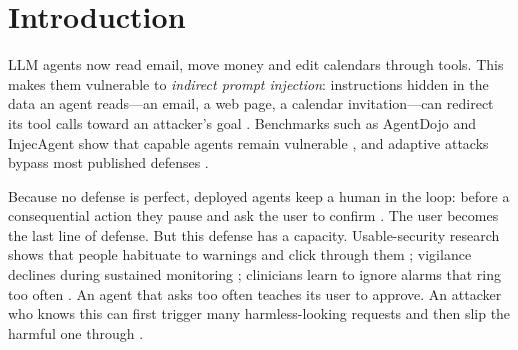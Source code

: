 \documentclass[10pt]{article}
\theoremstyle{plain}
\theoremstyle{definition}
\begin{document}
\section{Introduction}\label{sec:intro}

LLM agents now read email, move money and edit calendars through tools. This makes them vulnerable to \emph{indirect prompt injection}: instructions hidden in the data an agent reads---an email, a web page, a calendar invitation---can redirect its tool calls toward an attacker's goal \citep{greshake2023not}. Benchmarks such as AgentDojo and InjecAgent show that capable agents remain vulnerable \citep{debenedetti2024agentdojo,zhan2024injecagent}, and adaptive attacks bypass most published defenses \citep{nasr2025attacker,chen2026learning,autodojo2026}.

Because no defense is perfect, deployed agents keep a human in the loop: before a consequential action they pause and ask the user to confirm \citep{openai2025operator,kolluri2026prudentia,effectguard2026}. The user becomes the last line of defense. But this defense has a capacity. Usable-security research shows that people habituate to warnings and click through them \citep{akhawe2013alice,bravolillo2013attention,anderson2015polymorphic}; vigilance declines during sustained monitoring \citep{warm2008vigilance}; clinicians learn to ignore alarms that ring too often \citep{cvach2012alarm}. An agent that asks too often teaches its user to approve. An attacker who knows this can first trigger many harmless-looking requests and then slip the harmful one through \citep{turan2026oversight}.
\end{document}

